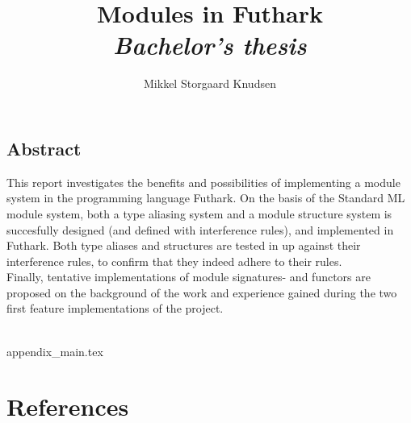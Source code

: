 \documentclass[12pt]{article}
\title{
  Modules in Futhark \\
\textit{Bachelor's thesis}
}
\author{Mikkel Storgaard Knudsen}
\begin{document}
\maketitle

\subsection*{Abstract}
\label{subsec:abstract}
This report investigates the benefits and possibilities of implementing a module system in the programming language Futhark. On the basis of the Standard ML module system, both a type aliasing system and a module structure system is succesfully designed (and defined with interference rules), and implemented in Futhark.
Both type aliases and structures are tested in up against their interference rules, to confirm that they indeed adhere to their rules.\\
Finally, tentative implementations of module signatures- and functors are proposed on the background of the work and experience gained during the two first feature implementations of the project.
\\\\
\clearpage
\tableofcontents
\clearpage

\clearpage

\clearpage

\clearpage

\clearpage

\clearpage









{appendix_main.tex}
\clearpage
\section{References}


\end{document}
